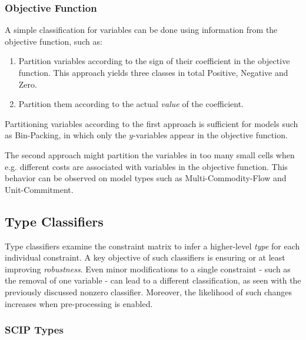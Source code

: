 				\clearpage
		
			\subsubsection{Objective Function}
			
				A simple classification for variables can be done using information from the objective function, such as:
				
				\begin{enumerate}
					\item Partition variables according to the sign of their coefficient in the objective function. This approach yields three classes in total Positive, Negative and Zero.
					\item Partition them according to the actual \textit{value} of the coefficient.
				\end{enumerate}
				
				Partitioning variables according to the first approach is sufficient for models such as Bin-Packing, in which only the $y$-variables appear in the objective function.
				
				The second approach might partition the variables in too many small cells when e.g. different costs are associated with variables in the objective function.
				This behavior can be observed on model types such as Multi-Commodity-Flow and Unit-Commitment.
				
				\clearpage
		
		\subsection{Type Classifiers}
		\label{chap:gcg:classifiers:type}
		
			Type classifiers examine the constraint matrix to infer a higher-level \textit{type} for each individual constraint.
			A key objective of such classifiers is ensuring or at least improving \textit{robustness}.
			Even minor modifications to a single constraint - such as the removal of one variable - can lead to a different classification, as seen with the previously discussed nonzero classifier.
			Moreover, the likelihood of such changes increases when pre-processing is enabled.
			
			\subsubsection{SCIP Types}
			
